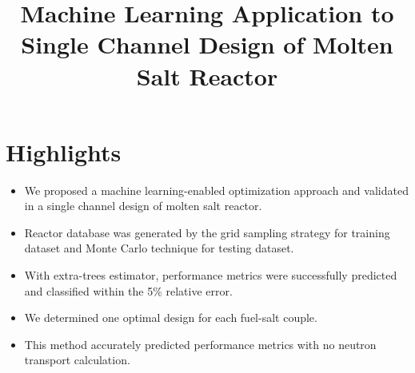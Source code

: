 
\begin{frontmatter} 
	\title{Machine Learning Application to Single Channel
		Design of Molten Salt Reactor} 
	\end{frontmatter} 
\section*{Highlights}
\begin{itemize} 
\item We proposed a machine learning-enabled optimization approach and validated
in a single channel design of molten salt reactor.
\item Reactor database was generated by the grid sampling strategy for training
dataset and Monte Carlo technique for testing dataset.
\item With extra-trees estimator, performance metrics were successfully
predicted and classified within the 5\% relative error.
\item We determined one optimal design for each fuel-salt couple. 
\item This method accurately predicted performance metrics with no neutron 
transport calculation.
\end{itemize}

